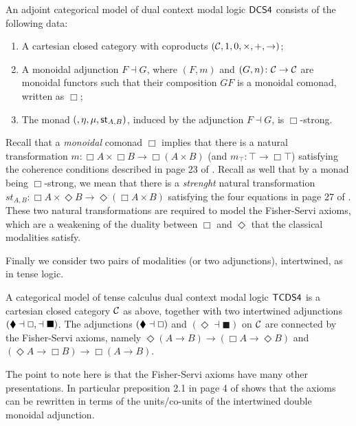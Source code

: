 \begin{definition}
  \label{def:CS4-single-adjoint-cat-model}
  An adjoint categorical model of dual context modal logic $\sf{DCS4}$
  consists of the following data:
  \begin{enumerate}
  \item A cartesian closed category with coproducts
    $(\mathcal{C},1,0,\times,+,\rightarrow)$;
  \item 
    A monoidal adjunction $F \dashv G$, where $(F,m)$ and $(G,n)\colon
    \mathcal{C} \rightarrow \mathcal{C}$ are monoidal functors such that their
    composition $GF$ is a monoidal comonad, written as $\Box$;
 \item The  monad $(\relax, \eta, \mu, \mathsf{st}_{A,B})$, induced by the adjunction $F \dashv G$,   is $\Box$-strong.
  \end{enumerate}
\end{definition}
Recall that a {\textit{monoidal}} comonad $\Box$ implies that there is a natural transformation $m\colon \Box A\times \Box B\to \Box (A\times B)$ (and $m_{\top}\colon \top \to \Box \top$) satisfying the coherence conditions described in page 23 of \cite{bierman2000}. Recall as well that by a monad being $\Box$-strong, we mean that there is a \textit{strenght} natural transformation $st_{A,B}\colon \Box A\times \Diamond B\to \Diamond(\Box A\times B)$ satisfying the four equations in page 27 of \cite{bierman2000}. These two natural transformations are required to model the Fisher-Servi axioms, which are a weakening of the duality between $\Box$ and $\Diamond$ that the classical modalities satisfy.

Finally we consider two pairs of modalities (or two adjunctions),
intertwined, as in tense logic.

\begin{definition}
A categorical model of tense calculus dual context modal logic
$\sf{TCDS4}$ is a cartesian closed category $\cal{C}$ as above,
together with two intertwined adjunctions $(\mathbin{\blacklozenge}\dashv \oblong,
\relax\dashv \blacksquare)$.  The adjunctions $(\mathbin{\blacklozenge}\dashv
\oblong)$ and $(\Diamond\dashv \blacksquare)$ on $\cal{C}$ are connected
by the Fisher-Servi axioms, namely $\Diamond (A\to B)\to (\Box A\to
\Diamond B)$ and $(\Diamond A\to \Box B)\to \Box (A\to B)$.
\end{definition}
The point to note here is that the Fisher-Servi axioms have many other presentations. In particular preposition 2.1 in page 4 of \cite{dzik2010} shows that the axioms can be rewritten in terms of the units/co-units of the intertwined double monoidal adjunction.



